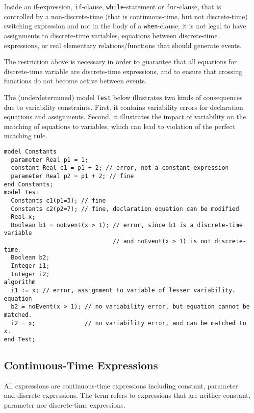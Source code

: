 Inside an if-expression, \lstinline!if!-clause, \lstinline!while!-statement or \lstinline!for!-clause, that
is controlled by a non-discrete-time (that is continuous-time, but not
discrete-time) switching expression and not in the body of a
\lstinline!when!-clause, it is not legal to have assignments to discrete-time variables,
equations between discrete-time expressions, or real elementary
relations/functions that should generate events.

\begin{nonnormative}
The restriction above is necessary in order to guarantee that all equations for discrete-time variable are discrete-time expressions, and to ensure that crossing
functions do not become active between events.
\end{nonnormative}

\begin{example}
The (underdetermined) model \lstinline!Test! below illustrates two kinds of consequences due to variability constraints.
First, it contains variability errors for declaration equations and assignments.
Second, it illustrates the impact of variability on the matching of equations to variables, which can
lead to violation of the perfect matching rule.
\begin{lstlisting}[language=modelica]
model Constants
  parameter Real p1 = 1;
  constant Real c1 = p1 + 2; // error, not a constant expression
  parameter Real p2 = p1 + 2; // fine
end Constants;
model Test
  Constants c1(p1=3); // fine
  Constants c2(p2=7); // fine, declaration equation can be modified
  Real x;
  Boolean b1 = noEvent(x > 1); // error, since b1 is a discrete-time variable
                               // and noEvent(x > 1) is not discrete-time.
  Boolean b2;
  Integer i1;
  Integer i2;
algorithm
  i1 := x; // error, assignment to variable of lesser variability.
equation
  b2 = noEvent(x > 1); // no variability error, but equation cannot be matched.
  i2 = x;              // no variability error, and can be matched to x.
end Test;
\end{lstlisting}
\end{example}

\subsection{Continuous-Time Expressions}\label{continuous-time-expressions}

All expressions are continuous-time expressions including constant, parameter and discrete expressions.
The term  refers to expressions that are neither constant, parameter nor discrete-time expressions.
